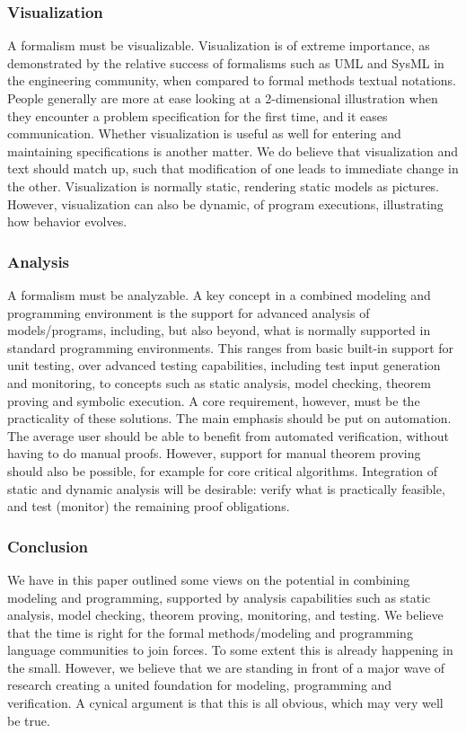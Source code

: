 \subsubsection{Visualization}

A formalism must be visualizable.
Visualization is of extreme importance, as demonstrated by the 
relative success of formalisms such as UML and SysML in the 
engineering community, when compared 
to formal methods textual notations. People generally are more at 
ease looking at a 2-dimensional illustration when they encounter a 
problem specification for the first
time, and it eases communication. Whether visualization is useful 
as well for entering
and maintaining specifications is another matter. We do believe 
that visualization and 
text should match up, such that modification of one leads to 
immediate change in the 
other. Visualization is normally static, rendering static models as
pictures. However, visualization can also be dynamic, of program 
executions, illustrating how behavior evolves.

\subsubsection{Analysis}

A formalism must be analyzable.
A key concept in a combined modeling and programming environment is 
the support for advanced analysis of models/programs, including, 
but also beyond, what is normally supported in standard programming 
environments. This ranges from basic built-in support for unit 
testing, over advanced testing capabilities, including test input 
generation and monitoring, to concepts such as static analysis, 
model checking, theorem proving and symbolic execution. A core 
requirement, however, must be the practicality of these solutions. 
The main emphasis should be put on automation. The average user 
should be able to benefit from automated verification, without 
having to do manual proofs. However, support for manual theorem 
proving should also be possible, for example for core critical 
algorithms. Integration of static and dynamic analysis will be 
desirable: verify what is practically feasible, and test (monitor) 
the remaining proof obligations.

\subsubsection{Conclusion}

We have in this paper outlined some views on the potential in 
combining modeling and programming, supported by analysis 
capabilities such as static analysis, model checking, theorem 
proving, monitoring, and testing. We believe that the time is right 
for the formal methods/modeling and programming language 
communities to join forces. To some extent this is already 
happening in the small. However, we believe that we are standing in 
front of a major wave of research creating a united foundation for 
modeling, programming and verification. A cynical argument is that 
this is all obvious, which may very well be true. 